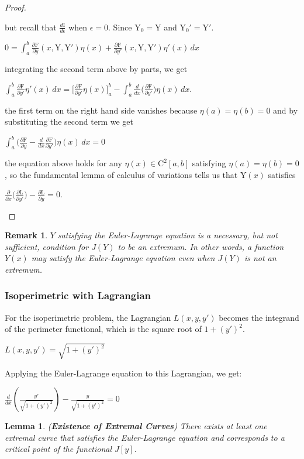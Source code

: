\documentclass[a4paper]{book}
\newtheorem{lemma}[theorem]{Lemma}%
\newtheorem{remark}[theorem]{Remark}%
\numberwithin{theorem}{section}%
\begin{document}
\begin{proof}
\begin{center}
    \end{center}
    but recall that $\displaystyle \frac{d\mathrm{I}}{d\epsilon}$ when $\epsilon=0$. Since $\mathrm{Y}_{0}=\mathrm{Y}$ and $\mathrm{Y}_{0}'=\mathrm{Y}'$.
    \begin{center}
        $\displaystyle 0=\int_{a}^{b}\frac{\partial\mathrm{F}}{\partial y}(x,\mathrm{Y},\mathrm{Y}')\eta(x)+\frac{\partial\mathrm{F}}{\partial y'}(x,\mathrm{Y},\mathrm{Y}')\eta'(x)\,dx$
    \end{center}
    integrating the second term above by parts, we get
    \begin{center}
        $\displaystyle \int_{a}^{b}\frac{\partial\mathrm{F}}{\partial y'}\eta'(x)\,dx=\Big[\frac{\partial\mathrm{F}}{\partial y'}\eta(x)\Big]_{a}^{b}-\int_{a}^{b}\frac{d}{dx}\Big(\frac{\partial\mathrm{F}}{\partial y'}\Big)\eta(x)\,dx$.
    \end{center}
    the first term on the right hand side vanishes because $\eta(a)=\eta(b)=0$ and by substituting the second term we get 
    \begin{center}
        $\displaystyle \int_{a}^{b}\Big(\frac{\partial\mathrm{F}}{\partial y}-\frac{d}{dx}\frac{\partial\mathrm{F}}{\partial y'}\Big)\eta(x)\,dx=0$
    \end{center}
    the equation above holds for any $\eta(x)\in\mathrm{C}^2[a,b]$ satisfying $\eta(a)=\eta(b)=0$, so the fundamental lemma of calculus of variations tells us that $\mathrm{Y}(x)$ satisfies
    \begin{center}
        $\displaystyle \frac{\partial}{\partial x}\Big(\frac{\partial \mathrm{L}}{\partial y'}\Big)-\frac{\partial \mathrm{L}}{\partial y}=0$.
    \end{center}
\end{proof}
\begin{remark}
	$Y$ satisfying the Euler-Lagrange equation is a necessary, but not sufficient, condition for $J(Y)$ to be an extremum. In other words, a function $Y(x)$ may satisfy the Euler-Lagrange equation even when $J(Y)$ is not an extremum.
\end{remark}
\subsubsection{Isoperimetric with Lagrangian}
For the isoperimetric problem, the Lagrangian $L(x, y, y')$ becomes the integrand of the perimeter functional, which is the square root of $1 + (y')^2$.
\begin{center}
	$\displaystyle L(x, y, y') = \sqrt{1 + (y')^2}$
\end{center}
Applying the Euler-Lagrange equation to this Lagrangian, we get:
\begin{center}
	$\displaystyle \frac{d}{dx} \left( \frac{y'}{\sqrt{1 + (y')^2}} \right) - \frac{y}{\sqrt{1 + (y')^2}} = 0$
\end{center}
\begin{lemma}(\textbf{Existence of Extremal Curves})
    There exists at least one extremal curve that satisfies the Euler-Lagrange equation and corresponds to a critical point of the functional \( J[y] \).
\end{lemma}
\end{document}
